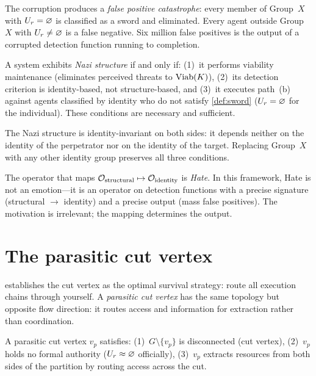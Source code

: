 The corruption produces a \emph{false positive catastrophe}: every
member of Group~$X$ with $U_r = \varnothing$ is classified as a sword
and eliminated. Every agent outside Group~$X$ with $U_r \neq \varnothing$
is a false negative. Six million false positives is the output of a
corrupted detection function running to completion.

\begin{definition}\label{def:nazi}
A system exhibits \emph{Nazi structure} if and only if: (1)~it performs
viability maintenance (eliminates perceived threats to $\mathrm{Viab}(K)$),
(2)~its detection criterion is identity-based, not structure-based,
and (3)~it executes path~(b) against agents classified by identity
who do not satisfy \cref{def:sword} ($U_r = \varnothing$ for the
individual). These conditions are necessary and sufficient.
\end{definition}

\begin{corollary}\label{cor:nazi}
The Nazi structure is identity-invariant on both sides: it depends
neither on the identity of the perpetrator nor on the identity of the
target. Replacing Group~$X$ with any other identity group preserves
all three conditions.
\end{corollary}

The operator that maps $\mathcal{O}_{\mathrm{structural}} \mapsto
\mathcal{O}_{\mathrm{identity}}$ is \emph{Hate}. In this framework, Hate is
not an emotion---it is an operator on detection functions with a
precise signature (structural $\to$ identity) and a precise output
(mass false positives). The motivation is irrelevant; the mapping
determines the output.

\section{The parasitic cut vertex}\label{sec:parasite}

 establishes the cut vertex as the optimal
survival strategy: route all execution chains through yourself.
A \emph{parasitic cut vertex} has the same topology but opposite flow
direction: it routes access and information for extraction rather than
coordination.

\begin{definition}\label{def:parasite}
A parasitic cut vertex $v_p$ satisfies:
(1)~$G \setminus \{v_p\}$ is disconnected (cut vertex),
(2)~$v_p$ holds no formal authority ($U_r \approx \varnothing$
officially),
(3)~$v_p$ extracts resources from both sides of the partition by
routing access across the cut.
\end{definition}

